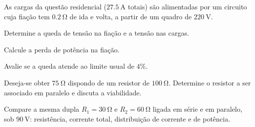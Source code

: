 \begin{questao}[3]{}

As cargas da questão residencial ($\SI{27.5}{\ampere}$ totais) são alimentadas
por um circuito cuja fiação tem $\SI{0.2}{\ohm}$ de ida e volta, a partir de um
quadro de $\SI{220}{\volt}$.
\begin{itensq}
\item Determine a queda de tensão na fiação e a tensão nas cargas.
\item Calcule a perda de potência na fiação.
\item Avalie se a queda atende ao limite usual de $4\%$.
\end{itensq}


\end{questao}
\begin{questao}[3]{}

Deseja-se obter $\SI{75}{\ohm}$ dispondo de um resistor de $\SI{100}{\ohm}$.
Determine o resistor a ser associado em paralelo e discuta a viabilidade.


\end{questao}
\begin{questao}[3]{}

Compare a mesma dupla $R_1=\SI{30}{\ohm}$ e $R_2=\SI{60}{\ohm}$ ligada em série
e em paralelo, sob $\SI{90}{\volt}$: resistência, corrente total, distribuição
de corrente e de potência.


\end{questao}

